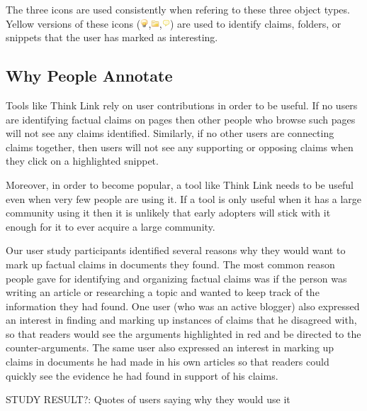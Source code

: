 \documentclass{chi2009}
\newcommand{\studyresult}[1]{{\color{red} STUDY RESULT?: #1}\\}
\begin{document}
The three icons are used consistently when refering to these three object types. 
Yellow versions of these icons (\includegraphics[width=0.3cm]{../images/lightbulb.png},\includegraphics[width=0.3cm]{../images/folder.png},\includegraphics[width=0.3cm]{../images/comment_yellow.png}) are used to identify claims, folders, or snippets that the user has marked as interesting.


\subsection{Why People Annotate}

Tools like Think Link rely on user contributions in order to be useful. If no users are identifying factual claims on pages then other people who browse such pages will not see any claims identified. Similarly, if no other users are connecting claims together, then users will not see any supporting or opposing claims when they click on a highlighted snippet.

Moreover, in order to become popular, a tool like Think Link needs to be useful even when very few people are using it. If a tool is only useful when it has a large community using it then it is unlikely that early adopters will stick with it enough for it to ever acquire a large community.

Our user study participants identified several reasons why they would want to mark up factual claims in documents they found. The most common reason people gave for identifying and organizing factual claims was if the person was writing an article or researching a topic and wanted to keep track of the information they had found. One user (who was an active blogger) also expressed an interest in finding and marking up instances of claims that he disagreed with, so that readers would see the arguments highlighted in red and be directed to the counter-arguments. The same user also expressed an interest in marking up claims in documents he had made in his own articles so that readers could quickly see the evidence he had found in support of his claims.

\studyresult{Quotes of users saying why they would use it}
\end{document}

